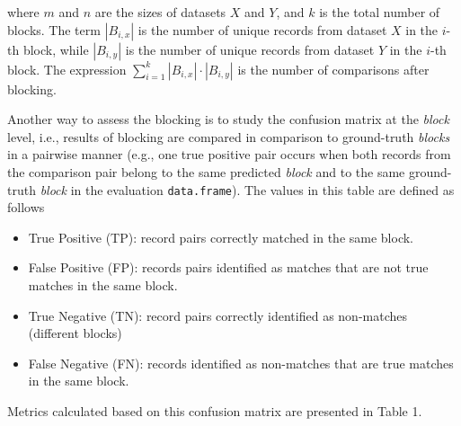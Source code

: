 \noindent where \(m\) and \(n\) are the sizes of datasets \(X\) and \(Y\), and
\(k\) is the total number of blocks. The term \(|B_{i,x}|\) is the number of
unique records from dataset \(X\) in the \(i\)-th block, while \(|B_{i,y}|\)
is the number of unique records from dataset \(Y\) in the \(i\)-th block.
The expression \(\sum\limits_{i=1}^{k} |B_{i,x}| \cdot |B_{i,y}|\) is the
number of comparisons after blocking.

Another way to assess the blocking is to study the confusion matrix at
the \emph{block} level, i.e., results of blocking are compared in comparison
to ground-truth \emph{blocks} in a pairwise manner (e.g., one true positive
pair occurs when both records from the comparison pair belong to the
same predicted \emph{block} and to the same ground-truth \emph{block} in the
evaluation \texttt{data.frame}). The values in this table are defined as
follows

\begin{itemize}
\tightlist
\item
  True Positive (TP): record pairs correctly matched in the same
  block.
\item
  False Positive (FP): records pairs identified as matches that are
  not true matches in the same block.
\item
  True Negative (TN): record pairs correctly identified as non-matches
  (different blocks)
\item
  False Negative (FN): records identified as non-matches that are true
  matches in the same block.
\end{itemize}

Metrics calculated based on this confusion matrix are presented in Table 1.


